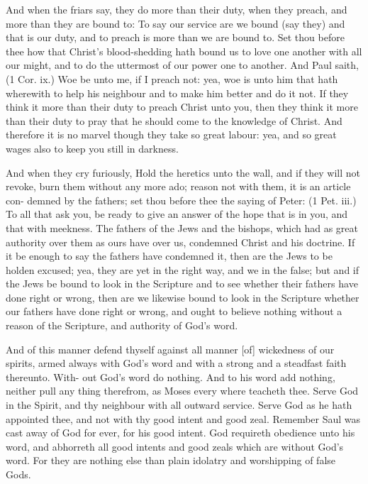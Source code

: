 \documentclass{custom}
\begin{document}
And when the friars say, they do more than their duty,
when they preach, and more than they are bound to: To
say our service are we bound (say they) and that is our
duty, and to preach is more than we are bound to. Set 
thou before thee how that Christ's blood-shedding hath 
bound us to love one another with all our might, and to do 
the uttermost of our power one to another. And Paul 
saith, (1 Cor. ix.) Woe be unto me, if I preach not: yea, 
woe is unto him that hath wherewith to help his neighbour 
and to make him better and do it not. If they think it 
more than their duty to preach Christ unto you, then they 
think it more than their duty to pray that he should come 
to the knowledge of Christ. And therefore it is no marvel 
though they take so great labour: yea, and so great wages 
also to keep you still in darkness. 

And when they cry furiously, Hold the heretics unto 
the wall, and if they will not revoke, burn them without 
any more ado; reason not with them, it is an article con- 
demned by the fathers; set thou before thee the saying 
of Peter: (1 Pet. iii.) To all that ask you, be ready to 
give an answer of the hope that is in you, and that with 
meekness. The fathers of the Jews and the bishops, 
which had as great authority over them as ours have over 
us, condemned Christ and his doctrine. If it be enough 
to say the fathers have condemned it, then are the Jews 
to be holden excused; yea, they are yet in the right way, 
and we in the false; but and if the Jews be bound to 
look in the Scripture and to see whether their fathers 
have done right or wrong, then are we likewise bound to 
look in the Scripture whether our fathers have done right 
or wrong, and ought to believe nothing without a reason 
of the Scripture, and authority of God's word. 

And of this manner defend thyself against all manner [of] 
wickedness of our spirits, armed always with God's word 
and with a strong and a steadfast faith thereunto. With- 
out God's word do nothing. And to his word add nothing, 
neither pull any thing therefrom, as Moses every where 
teacheth thee. Serve God in the Spirit, and thy 
neighbour with all outward service. Serve God as 
he hath appointed thee, and not with thy good intent 
and good zeal. Remember Saul was cast away of 
God for ever, for his good intent. God requireth 
obedience unto his word, and abhorreth all good intents 
and good zeals which are without God's word. For they 
are nothing else than plain idolatry and worshipping of 
false Gods. 
\end{document}
